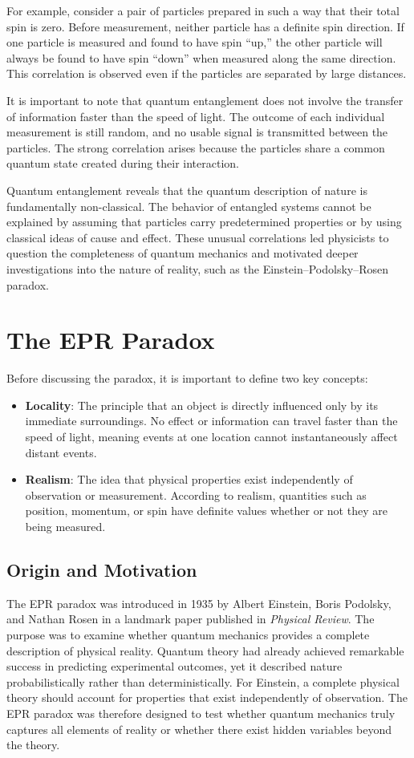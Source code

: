 \documentclass[14pt,a4paper]{extarticle}
\begin{document}
For example, consider a pair of particles prepared in such a way that their total spin is zero. Before measurement, neither particle has a definite spin direction. If one particle is measured and found to have spin “up,” the other particle will always be found to have spin “down” when measured along the same direction. This correlation is observed even if the particles are separated by large distances.

It is important to note that quantum entanglement does not involve the transfer of information faster than the speed of light. The outcome of each individual measurement is still random, and no usable signal is transmitted between the particles. The strong correlation arises because the particles share a common quantum state created during their interaction.

Quantum entanglement reveals that the quantum description of nature is fundamentally non-classical. The behavior of entangled systems cannot be explained by assuming that particles carry predetermined properties or by using classical ideas of cause and effect. These unusual correlations led physicists to question the completeness of quantum mechanics and motivated deeper investigations into the nature of reality, such as the Einstein–Podolsky–Rosen paradox.

\section{The EPR Paradox}
Before discussing the paradox, it is important to define two key concepts:
\begin{itemize}
\item \textbf{Locality}: The principle that an object is directly influenced only by its immediate surroundings. No effect or information can travel faster than the speed of light, meaning events at one location cannot instantaneously affect distant events.
\item \textbf{Realism}: The idea that physical properties exist independently of observation or measurement. According to realism, quantities such as position, momentum, or spin have definite values whether or not they are being measured.
\end{itemize}
\subsection{Origin and Motivation}
The EPR paradox was introduced in 1935 by Albert Einstein, Boris Podolsky, and Nathan Rosen in a landmark paper published in \textit{Physical Review}. The purpose was to examine whether quantum mechanics provides a complete description of physical reality. Quantum theory had already achieved remarkable success in predicting experimental outcomes, yet it described nature probabilistically rather than deterministically. For Einstein, a complete physical theory should account for properties that exist independently of observation. The EPR paradox was therefore designed to test whether quantum mechanics truly captures all elements of reality or whether there exist hidden variables beyond the theory.
\end{document}
